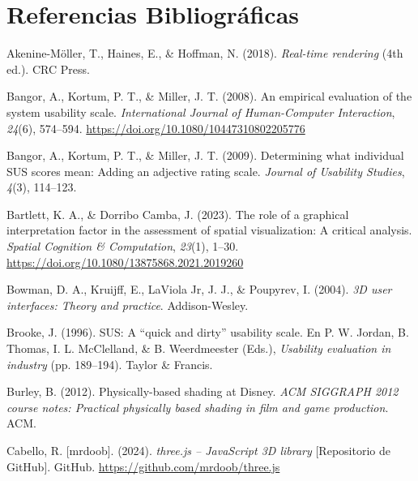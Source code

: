 \newpage
\section{Referencias Bibliogr\'aficas}

\begin{list}{}{%
    \setlength{\leftmargin}{1.27cm}
    \setlength{\itemindent}{-1.27cm}
    \setlength{\itemsep}{0pt}
    \setlength{\parsep}{0pt}
    \setlength{\topsep}{0pt}
    \setlength{\listparindent}{0pt}
    \setlength{\labelwidth}{0pt}
    \setlength{\labelsep}{0pt}
}
\RaggedRight

\item Akenine-M\"oller, T., Haines, E., \& Hoffman, N. (2018). \textit{Real-time rendering} (4th ed.). CRC Press.

\item Bangor, A., Kortum, P. T., \& Miller, J. T. (2008). An empirical evaluation of the system usability scale. \textit{International Journal of Human-Computer Interaction}, \textit{24}(6), 574--594. \url{https://doi.org/10.1080/10447310802205776}

\item Bangor, A., Kortum, P. T., \& Miller, J. T. (2009). Determining what individual SUS scores mean: Adding an adjective rating scale. \textit{Journal of Usability Studies}, \textit{4}(3), 114--123.

\item Bartlett, K. A., \& Dorribo Camba, J. (2023). The role of a graphical interpretation factor in the assessment of spatial visualization: A critical analysis. \textit{Spatial Cognition \& Computation}, \textit{23}(1), 1--30. \url{https://doi.org/10.1080/13875868.2021.2019260}

\item Bowman, D. A., Kruijff, E., LaViola Jr, J. J., \& Poupyrev, I. (2004). \textit{3D user interfaces: Theory and practice}. Addison-Wesley.

\item Brooke, J. (1996). SUS: A ``quick and dirty'' usability scale. En P. W. Jordan, B. Thomas, I. L. McClelland, \& B. Weerdmeester (Eds.), \textit{Usability evaluation in industry} (pp. 189--194). Taylor \& Francis.

\item Burley, B. (2012). Physically-based shading at Disney. \textit{ACM SIGGRAPH 2012 course notes: Practical physically based shading in film and game production}. ACM.

\item Cabello, R. [mrdoob]. (2024). \textit{three.js -- JavaScript 3D library} [Repositorio de GitHub]. GitHub. \url{https://github.com/mrdoob/three.js}


\end{list}
